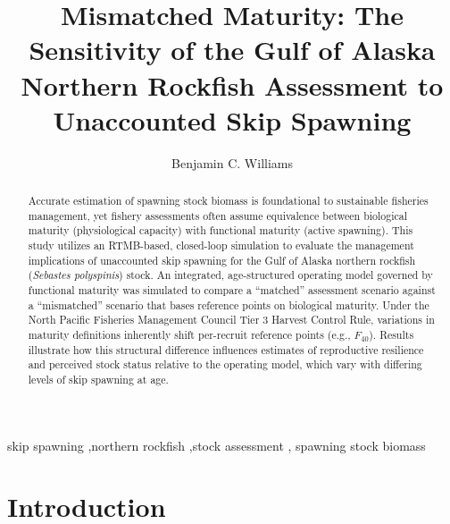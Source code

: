 \documentclass[
  authoryear,
  preprint,
  3p]{elsarticle}
\begin{document}
\begin{frontmatter}
\title{Mismatched Maturity: The Sensitivity of the Gulf of Alaska
Northern Rockfish Assessment to Unaccounted Skip Spawning}
\author[1]{Benjamin C. Williams%
%
}



        
\begin{abstract}
Accurate estimation of spawning stock biomass is foundational to
sustainable fisheries management, yet fishery assessments often assume
equivalence between biological maturity (physiological capacity) with
functional maturity (active spawning). This study utilizes an
RTMB-based, closed-loop simulation to evaluate the management
implications of unaccounted skip spawning for the Gulf of Alaska
northern rockfish (\emph{Sebastes polyspinis}) stock. An integrated,
age-structured operating model governed by functional maturity was
simulated to compare a ``matched'' assessment scenario against a
``mismatched'' scenario that bases reference points on biological
maturity. Under the North Pacific Fisheries Management Council Tier 3
Harvest Control Rule, variations in maturity definitions inherently
shift per-recruit reference points (e.g., \(F_{40}\)). Results
illustrate how this structural difference influences estimates of
reproductive resilience and perceived stock status relative to the
operating model, which vary with differing levels of skip spawning at
age.
\end{abstract}





\begin{keyword}
    skip spawning \sep northern rockfish \sep stock assessment \sep 
    spawning stock biomass
\end{keyword}
\end{frontmatter}
    

\section{Introduction}\label{introduction}
\end{document}
